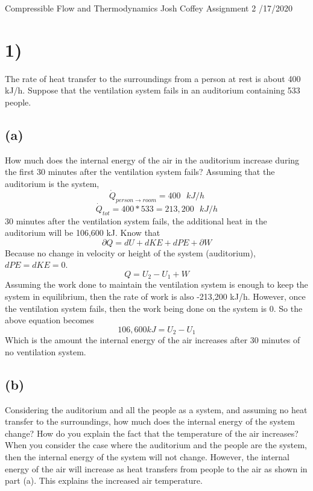 \documentclass[preview,12pt]{article}
\begin{document}
\noindent Compressible Flow and Thermodynamics\newline
Josh Coffey \newline
Assignment 2 /17/2020 \newline

\section*{1)}
    The rate of heat transfer to the surroundings from a person at rest is about 400 kJ/h. Suppose that the ventilation system fails in an auditorium containing 533 people.
    \subsection*{(a)}
        How much does the internal energy of the air in the auditorium increase during the first 30 minutes after the ventilation system fails? \newline
        Assuming that the auditorium is the system, 
        $$\dot{Q}_{person \rightarrow room}=400\textrm{ }kJ/h$$
        $$\dot{Q}_{tot}=400*533=213,200\textrm{ }kJ/h$$
        30 minutes after the ventilation system fails, the additional heat in the auditorium will be 106,600 kJ.
        \newline
        Know that 
        $$\partial Q =dU+dKE+dPE+\partial W$$
        Because no change in velocity or height of the system (auditorium), $dPE=dKE=0$.
        $$Q=U_2-U_1+W$$
        Assuming the work done to maintain the ventilation system is enough to keep the system in equilibrium, then the rate of work is also -213,200 kJ/h.  However, once the ventilation system fails, then the work being done on the system is 0.  So the above equation becomes
        $$106,600kJ=U_2-U_1$$
        Which is the amount the internal energy of the air increases after 30 minutes of no ventilation system.
    \subsection*{(b)}
        Considering the auditorium and all the people as a system, and assuming no heat transfer to the surroundings, how much does the internal energy of the system change? How do you explain the fact that the temperature of the air increases?
        $$$$
        When you consider the case where the auditorium and the people are the system, then the internal energy of the system will not change.  However, the internal energy of the air will increase as heat transfers from people to the air as shown in part (a).  This explains the increased air temperature.
        
\end{document}
